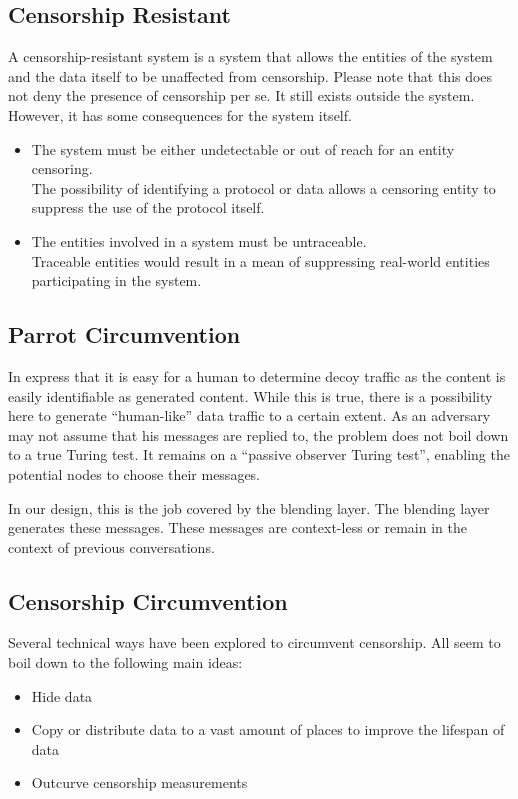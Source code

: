 \subsection{Censorship Resistant}
A censorship-resistant system is a system that allows the entities of the system and the data itself to be unaffected from censorship. Please note that this does not deny the presence of censorship per se. It still exists outside the system. However, it has some consequences for the system itself.

\begin{itemize}
	\item The system must be either undetectable or out of reach for an entity censoring.\\
	The possibility of identifying a protocol or data allows a censoring entity to suppress the use of the protocol itself. 
	\item The entities involved in a system must be untraceable.\\
	Traceable entities would result in a mean of suppressing real-world entities participating in the system.
\end{itemize}

\subsection{Parrot Circumvention}
In \cite{oakland2013-parrot} \citeauthor{oakland2013-parrot} express that it is easy for a human to determine decoy traffic as the content is easily identifiable as generated content. While this is true, there is a possibility here to generate ``human-like'' data traffic to a certain extent. As an adversary may not assume that his messages are replied to, the problem does not boil down to a true Turing test. It remains on a ``passive observer Turing test'', enabling the potential nodes to choose their messages. 

In our design, this is the job covered by the blending layer. The blending layer generates these messages. These messages are context-less or remain in the context of previous conversations.

\subsection{Censorship Circumvention}
Several technical ways have been explored to circumvent censorship. All seem to boil down to the following main ideas:
\begin{itemize}
	\item Hide data
	\item Copy or distribute data to a vast amount of places to improve the lifespan of data
	\item Outcurve censorship measurements
\end{itemize}

